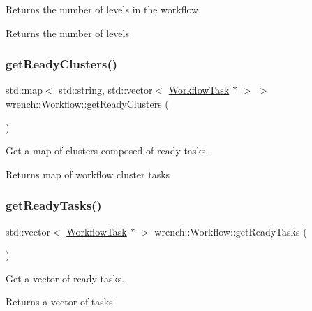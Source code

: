 Returns the number of levels in the workflow. 

\begin{DoxyReturn}{Returns}
the number of levels 
\end{DoxyReturn}
\mbox{\label{classwrench_1_1_workflow_a875d3d3a26eba6316e249169814b853f}} 
\subsubsection{\texorpdfstring{get\+Ready\+Clusters()}{getReadyClusters()}}
{\footnotesize\ttfamily std\+::map$<$ std\+::string, std\+::vector$<$ \hyperlink{classwrench_1_1_workflow_task}{Workflow\+Task} $\ast$ $>$ $>$ wrench\+::\+Workflow\+::get\+Ready\+Clusters (\begin{DoxyParamCaption}{ }\end{DoxyParamCaption})}



Get a map of clusters composed of ready tasks. 

\begin{DoxyReturn}{Returns}
map of workflow cluster tasks 
\end{DoxyReturn}
\mbox{\label{classwrench_1_1_workflow_a4834ec73e7a707338bad20d1da8a69ed}} 
\subsubsection{\texorpdfstring{get\+Ready\+Tasks()}{getReadyTasks()}}
{\footnotesize\ttfamily std\+::vector$<$ \hyperlink{classwrench_1_1_workflow_task}{Workflow\+Task} $\ast$ $>$ wrench\+::\+Workflow\+::get\+Ready\+Tasks (\begin{DoxyParamCaption}{ }\end{DoxyParamCaption})}



Get a vector of ready tasks. 

\begin{DoxyReturn}{Returns}
a vector of tasks 
\end{DoxyReturn}
\mbox{\label{classwrench_1_1_workflow_a2d6acb74faf1153f491bf7b52847ce82}} 
